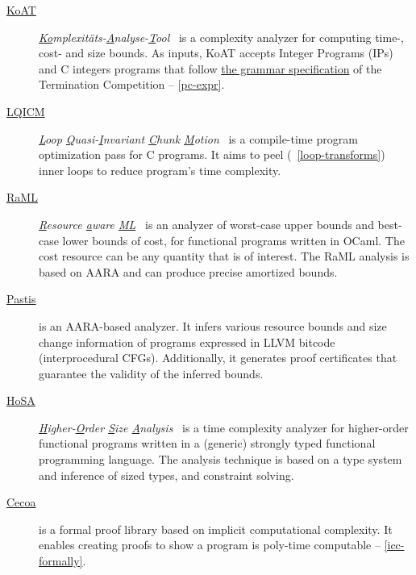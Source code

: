 \begin{description}
\item[\href{https://koat.verify.rwth-aachen.de/cfr_mprf}{KoAT}]
       \emph{\underline{Ko}mplexitäts-\underline{A}nalyse-\underline{T}ool}~\cite{brockschmidt2016}
       is a complexity analyzer for computing time-, cost- and size bounds.
       As inputs, KoAT accepts Integer Programs (IPs) and C integers programs that follow
       \href{https://termination-portal.org/wiki/C_Integer_Programs}{the grammar specification} of the Termination Competition -- \autoref{pc-expr}.

\item[\href{https://github.com/statycc/LQICM_On_C_Toy_Parser}{LQICM}]
      \emph{\underline{L}oop \underline{Q}uasi-\underline{I}nvariant \underline{C}hunk \underline{M}otion}~\cite{moyen20172}
       is a compile-time program optimization pass for C programs.
       It aims to peel (\cf~\autoref{loop-transforms}) inner loops to reduce program's time complexity.

\item[\href{https://www.raml.co/about}{RaML}]
       \emph{\underline{R}esource \underline{a}ware \underline{ML}}~\cite{hoffmann2017}
       is an analyzer of worst-case upper bounds and best-case lower bounds of cost, for functional programs written in OCaml.
       The cost resource can be any quantity that is of interest.
       The RaML analysis is based on AARA and can produce precise amortized bounds.

\item[\href{https://www.cs.yale.edu/homes/qcar/diss/}{Pastis}]\cite{carbonneaux2017,carbonneaux2018}
      is an AARA-based analyzer.
      It infers various resource bounds and size change information of programs expressed in LLVM bitcode (interprocedural CFGs).
      Additionally, it generates proof certificates that guarantee the validity of the inferred bounds.

\item[\href{http://cl-informatik.uibk.ac.at/users/zini/software/hosa/}{HoSA}]
      \emph{\underline{H}igher-\underline{O}rder \underline{S}ize \underline{A}nalysis}~\cite{avanzini2017}
      is a time complexity analyzer for higher-order functional programs written in a (generic) strongly typed functional programming language.
      The analysis technique is based on a type system and inference of sized types, and constraint solving.

\item[\href{https://github.com/davidnowak/cecoa}{Cecoa}]\cite{feree2018}
     is a formal proof library based on implicit computational complexity.
     It enables creating proofs to show a program is poly-time computable -- \autoref{icc-formally}.


\end{description}
